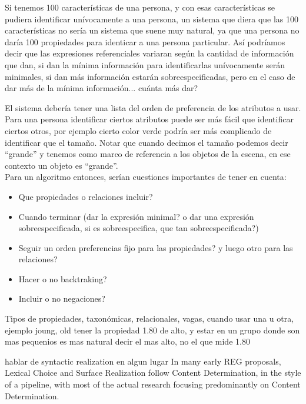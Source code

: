 Si tenemos 100 caracter\'isticas de una persona, y con esas caracter\'isticas se pudiera identificar un\'ivocamente a una persona, un sistema que diera que las 100 caracter\'isticas no ser\'ia un sistema que suene muy natural, ya que una persona no dar\'ia 100 propiedades para identicar a una persona particular. As\'i podr\'iamos decir que las expresiones referenciales variaran seg\'un la cantidad de informaci\'on que dan, si dan la m\'inima informaci\'on para identificarlas un\'ivocamente ser\'an minimales, si dan m\'as informaci\'on estar\'an sobreespecificadas, pero en el caso de dar m\'as de la m\'inima informaci\'on... cu\'anta m\'as dar?

El sistema deber\'ia tener una lista del orden de preferencia de los atributos a usar.\\ 

Para una persona identificar ciertos atributos puede ser m\'as f\'acil que identificar ciertos otros, por ejemplo cierto color verde podr\'{i}a ser m\'as complicado de identificar que el tama\~no. Notar que cuando decimos el tama\~no podemos decir ``grande'' y tenemos como marco de referencia a los objetos de la escena, en ese contexto un objeto es ``grande''.\\

Para un algoritmo entonces, ser\'ian cuestiones importantes de tener en cuenta:

\begin{itemize}
 \item Que propiedades o relaciones incluir?
 \item Cuando terminar (dar la expresi\'on minimal? o dar una expresi\'on sobreespecificada, si es sobreespecifica, que tan sobreespecificada?)
 \item Seguir un orden preferencias fijo para las propiedades? y luego otro para las relaciones?
 \item Hacer o no backtraking?
 \item Incluir o no negaciones?
\end{itemize}


Tipos de propiedades, taxon\'omicas, relacionales, vagas, cuando usar una u otra, ejemplo joung, old
tener la propiedad 1.80 de alto, y estar en un grupo donde son mas pequenios es mas natural decir el mas alto, no el que mide 1.80


hablar de syntactic realization en algun lugar
In many early REG proposals, Lexical Choice and Surface Realization follow Content
Determination,  in  the  style  of  a  pipeline,  with  most  of  the  actual  research  focusing
predominantly on Content Determination.

